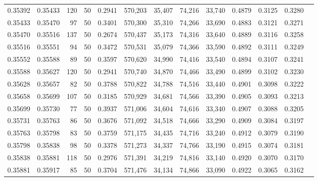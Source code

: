 \begin{tabular}{rrrrrrrrrrrrr}
0.35392 & 0.35433 &   120 &  50 &                                     0.2941 & 570,203 &  35,407 &  74,216 &  33,740 & 0.4879 & 0.3125 & 0.3280 \\
0.35433 & 0.35470 &    97 &  50 &                                     0.3401 & 570,300 &  35,310 &  74,266 &  33,690 & 0.4883 & 0.3121 & 0.3271 \\
0.35470 & 0.35516 &   137 &  50 &                                     0.2674 & 570,437 &  35,173 &  74,316 &  33,640 & 0.4889 & 0.3116 & 0.3258 \\
0.35516 & 0.35551 &    94 &  50 &                                     0.3472 & 570,531 &  35,079 &  74,366 &  33,590 & 0.4892 & 0.3111 & 0.3249 \\
0.35552 & 0.35588 &    89 &  50 &                                     0.3597 & 570,620 &  34,990 &  74,416 &  33,540 & 0.4894 & 0.3107 & 0.3241 \\
0.35588 & 0.35627 &   120 &  50 &                                     0.2941 & 570,740 &  34,870 &  74,466 &  33,490 & 0.4899 & 0.3102 & 0.3230 \\
0.35628 & 0.35657 &    82 &  50 &                                     0.3788 & 570,822 &  34,788 &  74,516 &  33,440 & 0.4901 & 0.3098 & 0.3222 \\
0.35658 & 0.35699 &   107 &  50 &                                     0.3185 & 570,929 &  34,681 &  74,566 &  33,390 & 0.4905 & 0.3093 & 0.3213 \\
0.35699 & 0.35730 &    77 &  50 &                                     0.3937 & 571,006 &  34,604 &  74,616 &  33,340 & 0.4907 & 0.3088 & 0.3205 \\
0.35731 & 0.35763 &    86 &  50 &                                     0.3676 & 571,092 &  34,518 &  74,666 &  33,290 & 0.4909 & 0.3084 & 0.3197 \\
0.35763 & 0.35798 &    83 &  50 &                                     0.3759 & 571,175 &  34,435 &  74,716 &  33,240 & 0.4912 & 0.3079 & 0.3190 \\
0.35798 & 0.35838 &    98 &  50 &                                     0.3378 & 571,273 &  34,337 &  74,766 &  33,190 & 0.4915 & 0.3074 & 0.3181 \\
0.35838 & 0.35881 &   118 &  50 &                                     0.2976 & 571,391 &  34,219 &  74,816 &  33,140 & 0.4920 & 0.3070 & 0.3170 \\
0.35881 & 0.35917 &    85 &  50 &                                     0.3704 & 571,476 &  34,134 &  74,866 &  33,090 & 0.4922 & 0.3065 & 0.3162 \\

\end{tabular}
